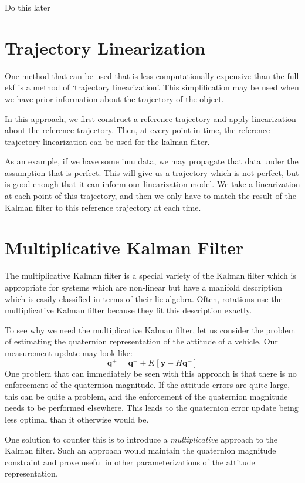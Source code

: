 \begin{example}
Do this later
\end{example}

\section{Trajectory Linearization}
One method that can be used that is less computationally expensive than the full \gls{ekf} is a method of `trajectory linearization'. This simplification may be used when we have prior information about the trajectory of the object. 

In this approach, we first construct a reference trajectory and apply linearization about the reference trajectory. Then, at every point in time, the reference trajectory linearization can be used for the kalman filter.

As an example, if we have some \gls{imu} data, we may propagate that data under the assumption that is perfect. This will give us a trajectory which is not perfect, but is good enough that it can inform our linearization model. We take a linearization at each point of this trajectory, and then we only have to match the result of the Kalman filter to this reference trajectory at each time.




\section{Multiplicative Kalman Filter}
The multiplicative Kalman filter is a special variety of the Kalman filter which is appropriate for systems which are non-linear but have a manifold description which is easily classified in terms of their \gls{lie algebra}. Often, rotations use the multiplicative Kalman filter because they fit this description exactly.

To see why we need the multiplicative Kalman filter, let us consider the problem of estimating the quaternion representation of the attitude of a vehicle. Our measurement update may look like:
$$\bm{q}^+=\bm{q}^-+K[\bm{y}-H\bm{q}^-]$$
One problem that can immediately be seen with this approach is that there is no enforcement of the quaternion magnitude. If the attitude errors are quite large, this can be quite a problem, and the enforcement of the quaternion magnitude needs to be performed elsewhere. This leads to the quaternion error update being less optimal than it otherwise would be.

One solution to counter this is to introduce a \textit{multiplicative} approach to the Kalman filter. Such an approach would maintain the quaternion magnitude constraint and prove useful in other parameterizations of the attitude representation.

